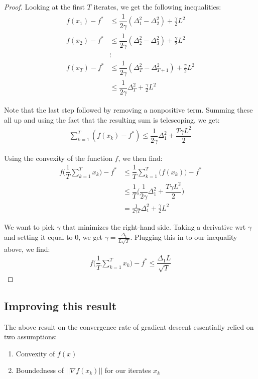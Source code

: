 \documentclass[12pt]{report}
\begin{document}
\begin{proof}
Looking at the first $T$ iterates, we get the following inequalities:
\begin{align*}
f(x_1) - f^* & \leq \dfrac{1}{2\gamma}(\Delta_1^2 - \Delta_2^2) + \frac{\gamma}{2}L^2\\
f(x_2) - f^* & \leq \dfrac{1}{2\gamma}(\Delta_2^2 - \Delta_3^2) + \frac{\gamma}{2}L^2\\
 & \vdots\\
f(x_T) - f^* & \leq \dfrac{1}{2\gamma}(\Delta_T^2 - \Delta_{T+1}^2) + \frac{\gamma}{2}L^2\\
& \leq \dfrac{1}{2\gamma}\Delta_T^2 + \frac{\gamma}{2}L^2
\end{align*}

Note that the last step followed by removing a nonpositive term. Summing these all up and using the fact that the resulting sum is telescoping, we get:
\begin{align*}
\sum_{k=1}^T(f(x_k)-f^*) \leq \dfrac{1}{2\gamma}\Delta_1^2 + \dfrac{T\gamma L^2}{2}
\end{align*}

Using the convexity of the function $f$, we then find:
\begin{align*}
f\bigg(\dfrac{1}{T}\sum_{k=1}^T x_k\bigg) - f^* & \leq \dfrac{1}{T} \sum_{k=1}^T \bigg(f(x_k)\bigg) - f^*\\
& \leq \dfrac{1}{T}\bigg(\dfrac{1}{2\gamma}\Delta_1^2 + \dfrac{T\gamma L^2}{2}\bigg)\\
& = \frac{1}{2\gamma T}\Delta_1^2 + \frac{\gamma}{2}L^2\end{align*}

We want to pick $\gamma$ that minimizes the right-hand side. Taking a derivative wrt $\gamma$ and setting it equal to 0, we get $\gamma = \frac{\Delta_1}{L\sqrt{T}}$. Plugging this in to our inequality above, we find:
\begin{align*}
f\bigg(\dfrac{1}{T}\sum_{k=1}^T x_k\bigg) - f^* \leq \dfrac{\Delta_1 L}{\sqrt{T}}\end{align*}
\end{proof}

\subsection{Improving this result}

The above result on the convergence rate of gradient descent essentially relied on two assumptions:
\begin{enumerate}
	\item Convexity of $f(x)$
	\item Boundedness of $||\nabla f(x_k)||$ for our iterates $x_k$
\end{enumerate}
\end{document}
